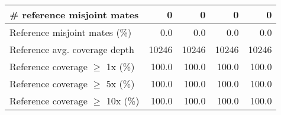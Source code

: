 \documentclass[12pt,a4paper]{article}
\begin{document}
\begin{table}[ht]
\begin{center}
\begin{tabular}{|l*{4}{|r}|}
\# reference misjoint mates & 0 & 0 & 0 & 0 \\ \hline
Reference misjoint mates (\%) & 0.0 & 0.0 & 0.0 & 0.0 \\ \hline
Reference avg. coverage depth & 10246 & 10246 & 10246 & 10246 \\ \hline
Reference coverage $\geq$ 1x (\%) & 100.0 & 100.0 & 100.0 & 100.0 \\ \hline
Reference coverage $\geq$ 5x (\%) & 100.0 & 100.0 & 100.0 & 100.0 \\ \hline
Reference coverage $\geq$ 10x (\%) & 100.0 & 100.0 & 100.0 & 100.0 \\ \hline
\end{tabular}
\end{center}
\end{table}
\end{document}
